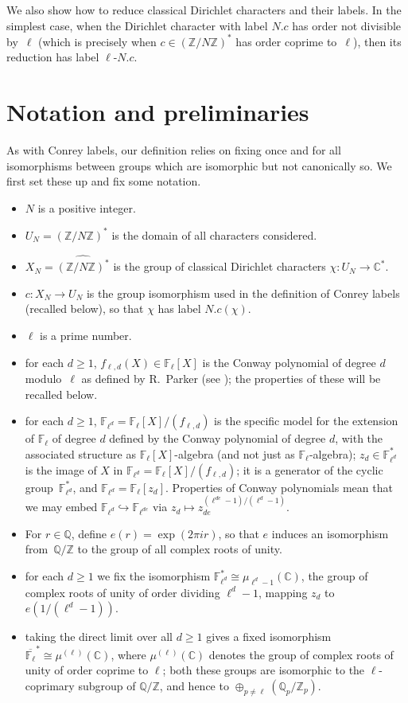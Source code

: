 \documentclass[a4paper, 10pt]{amsart}
\def\Z{{\mathbb Z}}
\def\Q{{\mathbb Q}}
\def\C{{\mathbb C}}
\def\F{{\mathbb F}}
\def\Fl{{\mathbb F}_{\ell}}
\def\Fld{{\mathbb F}_{\ell^d}}
\def\Flbar{\overline{{\mathbb F}_{\ell}}}
\def\ZNs{(\Z/N\Z)^*}
\def\ZNsh{\widehat{\ZNs}}
\newcommand{\CLab}[2]{$#1.#2$}
\newcommand{\DLab}[3]{$#1$-$#2.#3$}
\begin{document}
We also show how to reduce classical Dirichlet characters and their
labels.  In the simplest case, when the Dirichlet character with label
\CLab{N}{c} has order not divisible by~$\ell$ (which is precisely
when $c\in\ZNs$ has order coprime to~$\ell$), then its reduction
has label \DLab{\ell}{N}{c}.

\section{Notation and preliminaries}

As with Conrey labels, our definition relies on fixing once and for
all isomorphisms between groups which are isomorphic but not
canonically so.  We first set these up and fix some notation.

\begin{itemize}
\item $N$ is a positive integer.
\item $U_N=\ZNs$ is the domain of all characters considered.
\item $X_N=\ZNsh$ is the group of classical Dirichlet characters
  $\chi:U_N\to\C^*$.
\item $c:X_N\to U_N$ is the group isomorphism used in the
  definition of Conrey labels (recalled below), so that $\chi$ has
  label \CLab{N}{c(\chi)}.
\item $\ell$ is a prime number.
\item for each $d\ge1$, $f_{\ell,d}(X) \in \Fl[X]$ is the Conway
  polynomial of degree $d$ modulo~$\ell$ as defined by R.~Parker (see
  \cite{ConwayPol}); the properties of these will be recalled below.
\item for each $d\ge1$, $\Fld=\Fl[X]/(f_{\ell,d})$ is the specific
  model for the extension of $\Fl$ of degree $d$ defined by the Conway
  polynomial of degree $d$, with the associated structure as
  $\Fl[X]$-algebra (and not just as $\Fl$-algebra); $z_d\in\Fld^*$ is
  the image of $X$ in $\Fld=\Fl[X]/(f_{\ell,d})$; it is a generator of
  the cyclic group~$\Fld^*$, and $\Fld=\Fl[z_d]$.  Properties of
  Conway polynomials mean that we may embed
  $\Fld\hookrightarrow\F_{\ell^{de}}$ via $z_d\mapsto
  z_{de}^{(\ell^{de}-1)/(\ell^d-1)}$.
\item For $r\in\Q$, define $e(r)=\exp(2\pi ir)$, so that $e$ induces an
  isomorphism from~$\Q/\Z$ to the group of all complex roots of unity.
\item for each $d\ge1$ we fix the isomorphism
  $\Fld^*\cong\mu_{\ell^d-1}(\C)$, the group of complex roots of unity
  of order dividing $\ell^d-1$, mapping $z_d$ to $e(1/(\ell^d-1))$.
\item taking the direct limit over all $d\ge1$ gives a fixed
  isomorphism $\Flbar^*\cong\mu^{(\ell)}(\C)$, where
  $\mu^{(\ell)}(\C)$ denotes the group of complex roots of unity of
  order coprime to $\ell$; both these groups are isomorphic to the
  $\ell$-coprimary subgroup of $\Q/\Z$, and hence to
  $\oplus_{p\not=\ell}(\Q_p/\Z_p)$.
\end{itemize}
\end{document}
